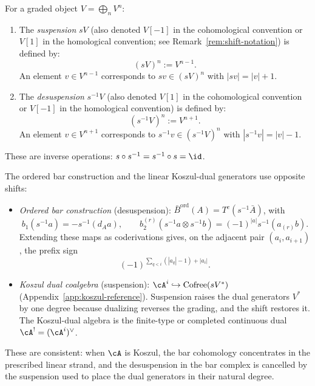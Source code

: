 \begin{definition}
\label{def:suspension}
For a graded object $V = \bigoplus_n V^n$:
\begin{enumerate}[label=(\roman*)]
\item The \emph{suspension} $sV$ (also denoted $V[-1]$ in the cohomological convention or $V[1]$ in the homological convention; see Remark~\ref{rem:shift-notation}) is
defined by:
\[
(sV)^n := V^{n-1}.
\]
An element $v \in V^{n-1}$ corresponds to $sv \in (sV)^n$ with $|sv| = |v| + 1$.

\item The \emph{desuspension} $s^{-1}V$ (also denoted $V[1]$ in the cohomological convention or $V[-1]$ in the homological convention) is defined by:
\[
(s^{-1}V)^n := V^{n+1}.
\]
An element $v \in V^{n+1}$ corresponds to $s^{-1}v \in (s^{-1}V)^n$ with
$|s^{-1}v| = |v| - 1$.
\end{enumerate}
These are inverse operations: $s \circ s^{-1} = s^{-1} \circ s = \id$.

The ordered bar construction and the linear Koszul-dual generators use
opposite shifts:
\begin{itemize}
\item \emph{Ordered bar construction} (desuspension):
$\bar{B}^{\mathrm{ord}}(A)=T^c(s^{-1}\bar A)$, with
\[
b_1(s^{-1}a)=-s^{-1}(d_Aa),\qquad
b_2^{(r)}(s^{-1}a\otimes s^{-1}b)
=(-1)^{|a|}s^{-1}(a_{(r)}b).
\]
Extending these maps as coderivations gives, on the adjacent pair
$(a_i,a_{i+1})$, the prefix sign
\[
(-1)^{\sum_{q<i}(|a_q|-1)+|a_i|}.
\]
\item \emph{Koszul dual coalgebra} (suspension):
$\cA^i \hookrightarrow \mathrm{Cofree}(sV^*)$
(Appendix~\ref{app:koszul-reference}). Suspension raises the dual
generators $V^*$ by one degree because dualizing reverses the grading,
and the shift restores it. The Koszul-dual algebra is the finite-type
or completed continuous dual $\cA^!=(\cA^i)^\vee$.
\end{itemize}
These are consistent: when $\cA$ is Koszul, the bar cohomology
concentrates in the prescribed linear strand, and the desuspension in the
bar complex is cancelled by the suspension used to place the dual
generators in their natural degree.
\end{definition}

